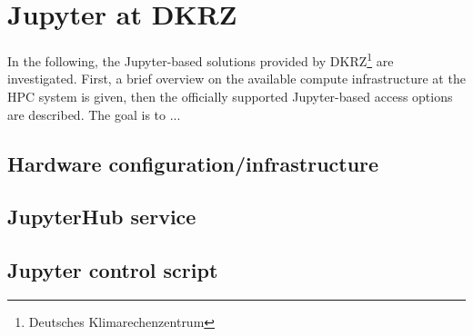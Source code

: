 \section{Jupyter at DKRZ}
\label{sect:jupyter-at-dkrz}

In the following, the Jupyter-based solutions provided by DKRZ\footnote{Deutsches Klimarechenzentrum} are investigated.
First, a brief overview on the available compute infrastructure at the HPC system is given, then the officially supported Jupyter-based access options are described.
The goal is to ...

\subsection{Hardware configuration/infrastructure}

\subsection{JupyterHub service}

\subsection{Jupyter control script}
